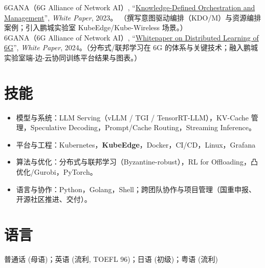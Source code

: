 \documentclass{resume}
\begin{document}
6GANA（6G Alliance of Network AI）, ``\href{https://www.6g-ana.com/upload/file/20230313/6381433864517755268320123.pdf}{Knowledge-Defined Orchestration and Management}'', \emph{White Paper}, 2023。 （撰写意图驱动编排（KDO/M）与资源编排案例；引入鹏城实验室 KubeEdge/Kube-Wireless 场景。）\\

6GANA（6G Alliance of Network AI）, ``\href{https://www.6g-ana.com/upload/file/20240129/6384212141255667878785630.pdf}{Whitepaper on Distributed Learning of 6G}'', \emph{White Paper}, 2024。（分布式/联邦学习在 6G 的体系与关键技术；融入鹏城实验室端-边-云协同训练平台结果与图表。）\\


\section{技能}
\begin{itemize}[parsep=0.5ex]
    \item 模型与系统：LLM Serving（vLLM / TGI / TensorRT-LLM），KV-Cache 管理，Speculative Decoding，Prompt/Cache Routing，Streaming Inference。
    \item 平台与工程：Kubernetes，\textbf{KubeEdge}，Docker，CI/CD，Linux，Grafana
    \item 算法与优化：分布式与联邦学习（Byzantine-robust），RL for Offloading，凸优化/Gurobi，PyTorch。
    \item 语言与协作：Python，Golang，Shell；跨团队协作与项目管理（国重申报、开源社区推进、交付）。
    
\end{itemize}

\section{语言}
普通话 (母语)；英语 (流利, TOEFL 96)；日语 (初级)；粤语 (流利)

\end{document}
